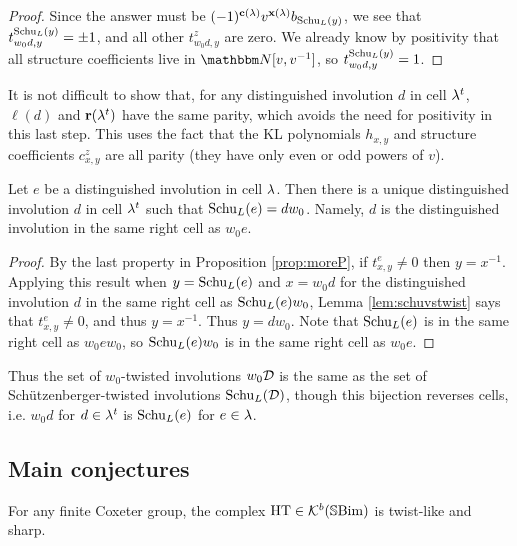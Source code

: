\begin{proof}
Since the answer must be $(-1)^{\mathbf{c}(\lambda)} v^{\mathbf{x}(\lambda)} b_{\operatorname{Schu}_L(y)}$, we see that $t_{w_0 d,y}^{\operatorname{Schu}_L(y)} = \pm 1$, and all other $t_{w_0 d, y}^z$ are zero. We already know by positivity that all structure coefficients live in $\N[v,v\inv]$, so $t_{w_0 d,y}^{\operatorname{Schu}_L(y)} = 1$. \end{proof}

\begin{remark} It is not difficult to show that, for any distinguished involution $d$ in cell $\lambda^t$, $\ell(d)$ and $\mathbf{r}(\lambda^t)$ have the same parity, which avoids the need for
positivity in this last step. This uses the fact that the KL polynomials $h_{x,y}$ and structure coefficients $c_{x,y}^z$ are all parity (they have only even or odd powers of $v$).
\end{remark}

\begin{cor} \label{cor:schudistinguished} Let $e$ be a distinguished involution in cell $\lambda$. Then there is a unique distinguished involution $d$ in cell $\lambda^t$ such that $\operatorname{Schu}_L(e) = d
w_0$. Namely, $d$ is the distinguished involution in the same right cell as $w_0 e$. \end{cor}
	
\begin{proof} By the last property in Proposition \ref{prop:moreP}, if $t_{x,y}^e \ne 0$ then $y = x^{-1}$. Applying this result when $y = \operatorname{Schu}_L(e)$ and $x = w_0 d$ for the
distinguished involution $d$ in the same right cell as $\operatorname{Schu}_L(e) w_0$, Lemma \ref{lem:schuvstwist} says that $t_{x,y}^e \ne 0$, and thus $y = x^{-1}$. Thus $y = d w_0$. Note that
$\operatorname{Schu}_L(e)$ is in the same right cell as $w_0 e w_0$, so $\operatorname{Schu}_L(e) w_0$ is in the same right cell as $w_0 e$. \end{proof}

Thus the set of $w_0$-twisted involutions $w_0 {\mathcal{D}}$ is the same as the set of Sch\"utzenberger-twisted involutions $\operatorname{Schu}_L({\mathcal{D}})$, though this bijection reverses cells, i.e. $w_0 d$ for
$d \in \lambda^t$ is $\operatorname{Schu}_L(e)$ for $e \in \lambda$.

\subsection{Main conjectures}
\label{subsec:sharpconj}

\begin{conjecture} \label{conj:HTaction} For any finite Coxeter group, the complex $\operatorname{HT} \in {\mathcal{K}}^b({\mathbb{S}}{\rm Bim })$ is twist-like and sharp. \end{conjecture}

